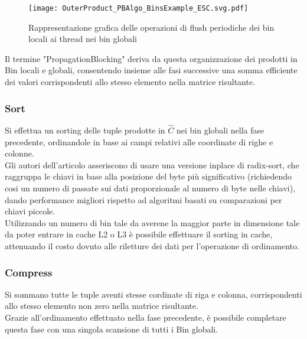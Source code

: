 \begin{figure}[H]
  \centering \texttt{[image: OuterProduct\_PBAlgo\_BinsExample\_ESC.svg.pdf]}
  \caption[flush periodiche prodotti intermedi in ESC-PropagationBlocking]
  {Rappresentazione grafica delle operazioni di flush periodiche dei bin locali ai thread nei bin globali}
  \decoRule \label{fig:OuterProduct_PBAlgo_BinsExample_ESC.svg.pdf}
\end{figure}

Il termine "PropagationBlocking" deriva da questa organizzazione dei prodotti in Bin locali e globali, 
consentendo insieme alle fasi successive una somma efficiente dei valori 
corrispondenti allo stesso elemento \nnz nella matrice risultante.\\

\subsubsection{Sort}
Si effettua un sorting delle tuple prodotte in $\hat{C}$ nei bin globali nella fase precedente,
ordinandole in base ai campi relativi alle coordinate di righe e colonne.\\
Gli autori dell'articolo asseriscono di usare una versione inplace di radix-sort, 
che raggruppa le chiavi in base alla posizione del byte più significativo 
(richiedendo cosi un numero di passate sui dati proporzionale al numero di byte nelle chiavi),
dando performance migliori rispetto ad algoritmi basati su comparazioni per chiavi piccole.\\
Utilizzando un numero di bin tale da averene la maggior parte in dimensione tale 
da poter entrare in cache L2 o L3 è possibile effettuare il sorting in cache, 
attenuando il costo dovuto alle riletture dei dati per l'operazione di ordinamento.

\subsubsection{Compress}
Si sommano tutte le tuple aventi stesse cordinate di riga e colonna, corrispondenti allo stesso elemento non zero
nella matrice risultante.\\
Grazie all'ordinamento effettuato nella fase precedente, è possibile completare questa fase con una singola
scansione di tutti i Bin globali.\\


